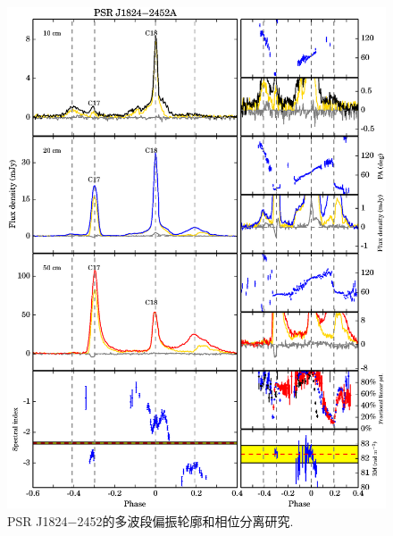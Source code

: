 \begin{figure}
\begin{center}
\includegraphics[width=6 in]{1824.ps}
\caption{PSR J1824$-$2452的多波段偏振轮廓和相位分离研究.}
\label{1824}
\end{center}
\end{figure}

